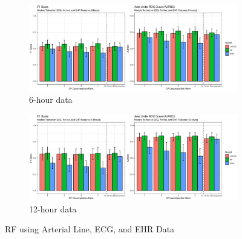 \begin{figure}[htb]
    \centering
    \begin{subfigure}[htb]{\textwidth}
        \includegraphics[width=\textwidth]{body/figures/all_6.eps}
        \caption{6-hour data}
    \end{subfigure}
    \hfill
    \begin{subfigure}[htb]{\textwidth}
        \includegraphics[width=\textwidth]{body/figures/all_12.eps}
        \caption{12-hour data}
    \end{subfigure}
    \caption{RF using Arterial Line, ECG, and EHR Data}
    \label{fig:sigEHR}
\end{figure}  %



\clearpage